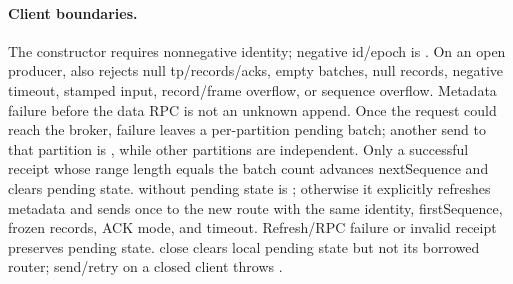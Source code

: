 \paragraph{Client boundaries.}The  constructor requires nonnegative identity; negative id/epoch is . On an open producer,  also rejects null tp/records/acks, empty batches, null records, negative timeout, stamped input, record/frame overflow, or sequence overflow. Metadata failure before the data RPC is not an unknown append. Once the request could reach the broker, failure leaves a per-partition pending batch; another send to that partition is , while other partitions are independent. Only a successful receipt whose range length equals the batch count advances nextSequence and clears pending state.  without pending state is ; otherwise it explicitly refreshes metadata and sends once to the new route with the same identity, firstSequence, frozen records, ACK mode, and timeout. Refresh/RPC failure or invalid receipt preserves pending state. close clears local pending state but not its borrowed router; send/retry on a closed client throws .
